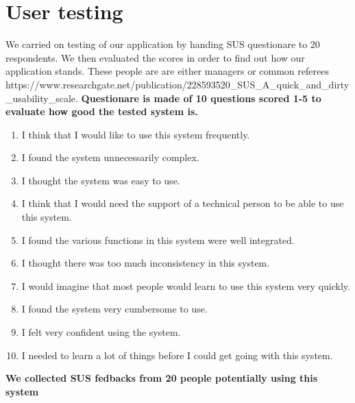 \section{User testing}
We carried on testing of our application by handing SUS questionare to 20 respondents. We then evaluated the scores in order to find out how our application stands. These people are are either managers or common referees https://www.researchgate.net/publication/228593520\_SUS\_A\_quick\_and\_dirty\_usability\_scale. 
\newline
\textbf{Questionare is made of 10 questions scored 1-5 to evaluate how good the tested system is.}
\begin{enumerate}
    \item I think that I would like to use this system frequently.
    \item I found the system unnecessarily complex.
    \item I thought the system was easy to use.
    \item I think that I would need the support of a technical person to be able to use this system.
    \item I found the various functions in this system were well integrated.
    \item I thought there was too much inconsistency in this system.
    \item I would imagine that most people would learn to use this system very quickly.
    \item I found the system very cumbersome to use.
    \item I felt very confident using the system.
    \item I needed to learn a lot of things before I could get going with this system.
\end{enumerate}
\textbf{We collected SUS fedbacks from 20 people potentially using this system}
\newline
